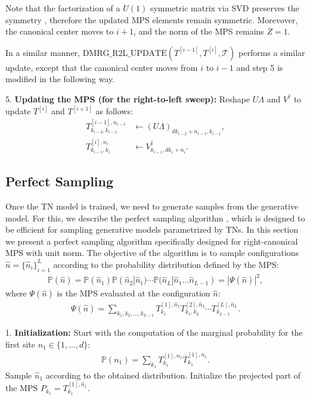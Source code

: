 Note that the factorization of a $U(1)$ symmetric matrix via SVD preserves the symmetry \cite{PhysRevB.83.115125}, therefore the updated MPS elements remain symmetric. Morevover, the canonical center moves to $i+1$, and the norm of the MPS remains $Z=1$.


In a similar manner, $\text{DMRG\_R2L\_UPDATE}\left(T^{[i-1]}, T^{[i]}, \mathcal T\right)$ performs a similar update, except that the canonical center moves from $i$ to $i-1$ and step 5 is modified in the following way.

5. \textbf{Updating the MPS (for the right-to-left sweep):}
    Reshape $U\Lambda$ and $V^\dagger$ to update $T^{[i]}$ and $T^{[i+1]}$ as follows:
   \begin{align}
       T^{[i-1], n_{i-1}}_{k_{i-2}, k_{i-1}} & \leftarrow \left(U\Lambda\right)_{d k_{i-2} + n_{i-1}, k_{i-1}}, \\
       T^{[i], n_{i}}_{k_{i-1}, k_{i}} & \leftarrow V^\dagger_{k_{i-1}, d k_{i} + n_{i}}.
   \end{align}


\subsection{Perfect Sampling}\label{sec:perfect_sampling}

Once the TN model is trained, we need to generate samples from the generative model. For this, we describe the perfect sampling algorithm \cite{PhysRevB.85.165146}, which is designed to be efficient for sampling generative models parametrized by TNs. In this section we present a perfect sampling algorithm specifically designed for right-canonical MPS with unit norm. The objective of the algorithm is to sample configurations $\hat n = \{ \hat{n}_i \}_{i=1}^L$ according to the probability distribution defined by the MPS:
\begin{align}
    \mathbb{P}(\hat n)=\mathbb{P}(\hat n_1)\mathbb{P}(\hat n_2|\hat n_1)\cdots\mathbb{P}(\hat n_L|\hat n_1\ldots\hat n_{L-1})=|\Psi(\hat n)|^2,
\end{align}
where $\Psi(\hat n)$ is the MPS evaluated at the configuration $\hat{n}$:
\begin{align}
    \Psi(\hat n) = \sum_{k_1, k_2, \ldots, k_{L-1}}T^{[1],\hat n_1}_{k_1}T^{[2],\hat n_2}_{k_1,k_2}\cdots T^{[L],\hat{n}_L}_{k_{L-1}}.
\end{align}

1. \textbf{Initialization:} Start with the computation of the marginal probability for the first site $n_1\in\{1,\ldots,d\}$:
\begin{align}
    \mathbb{P}(n_1) = \sum_{k_1} T^{[1],n_1}_{k_1} \overline{T}^{[1],n_1}_{k_1}.
\end{align}
Sample $\hat n_1$ according to the obtained distribution. Initialize the projected part of the MPS $P_{k_1} = T^{[1], \hat{n}_1}_{k_1}$.

